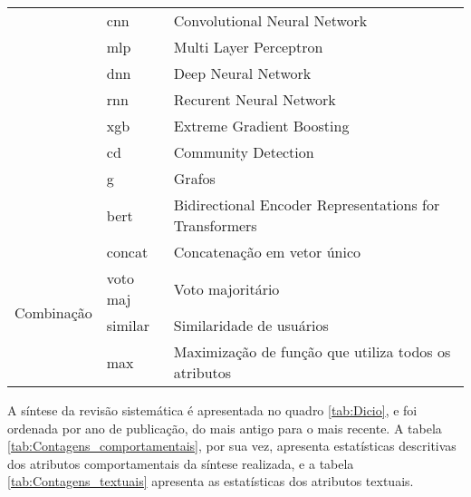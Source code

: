 \documentclass[
	12pt, oneside, a4paper, english, brazil
]{abntex2ppgsi}
\begin{document}
\begin{quadro}[H]
\begin{tabular}{
            | p{1.5in} | p{0.5in} | p{3in} |
        }
            & cnn & Convolutional Neural Network \\
            & mlp & Multi Layer Perceptron \\ 
            & dnn & Deep Neural Network \\ 
            & rnn & Recurent Neural Network \\ 
            & xgb & Extreme Gradient Boosting \\ 
            & cd & Community Detection \\ 
            & g & Grafos \\ 
            & bert & Bidirectional Encoder Representations for Transformers \\ \hline
        \multirow{4}{*}{ Combinação }
            & concat & Concatenação em vetor único \\ 
            & voto maj & Voto majoritário \\ 
            & similar & Similaridade de usuários \\ 
            & max & Maximização de função que utiliza todos os atributos \\ \hline
        \end{tabular}
	\label{tab:Dicio}
\end{quadro}

A síntese da revisão sistemática é apresentada no quadro \ref{tab:Dicio}, e foi ordenada por ano de publicação, do mais antigo para o mais recente. A tabela \ref{tab:Contagens_comportamentais}, por sua vez, apresenta estatísticas descritivas dos atributos comportamentais da síntese realizada, e a tabela \ref{tab:Contagens_textuais} apresenta as estatísticas dos atributos textuais.
\end{document}

